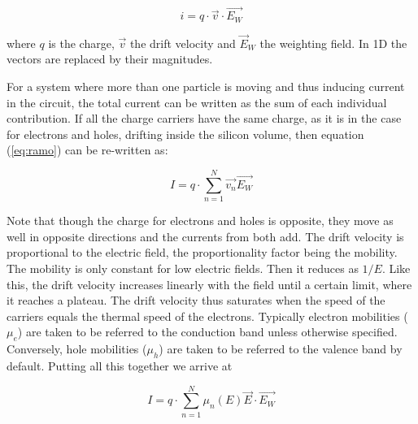 \begin{equation}
	i = q \cdot \overrightarrow {v} \cdot \overrightarrow {E_{W}}
	\label{eq:ramo} 
\end{equation} 

where $q$ is the charge, $\overrightarrow {v}$ the drift velocity and $\overrightarrow E_{W}$ the weighting
field. In 1D the vectors are replaced by their magnitudes.

For a system where more than one particle is moving and thus inducing current in
the circuit, the total current can be written as the sum of each individual
contribution. If all the charge carriers have the same charge, as it is in the
case for electrons and holes, drifting inside the silicon volume, then equation
(\ref{eq:ramo}) can be re-written as:

\begin{equation}
	I = q \cdot \sum_{n=1}^{N} \overrightarrow {v_n}\overrightarrow {E_{W}} 	\label{eq:ramoTot} 
\end{equation} 

Note that though the charge for electrons and holes is opposite, they move as
well in opposite directions and the currents from both add. The drift velocity 
is proportional to the electric field, the proportionality factor being 
the mobility. The mobility is only constant for low electric fields. Then 
it reduces as $1/E$. Like this, the drift velocity increases linearly with 
the field until a certain limit, where it reaches a plateau. The drift 
velocity thus saturates when the speed of the carriers equals the thermal 
speed of the electrons. Typically electron mobilities ($ \mu_e $) are taken to 
be referred to the conduction band unless otherwise specified. Conversely, 
hole mobilities ($ \mu_h $) are taken to be referred to the valence band 
by default. Putting all this together we arrive at 

\begin{equation}
	I = q \cdot \sum_{n=1}^{N} \mu_n(E) \overrightarrow {E} \cdot \overrightarrow {E_{W}} 
\label{eq:ramoMob}
\end{equation}

